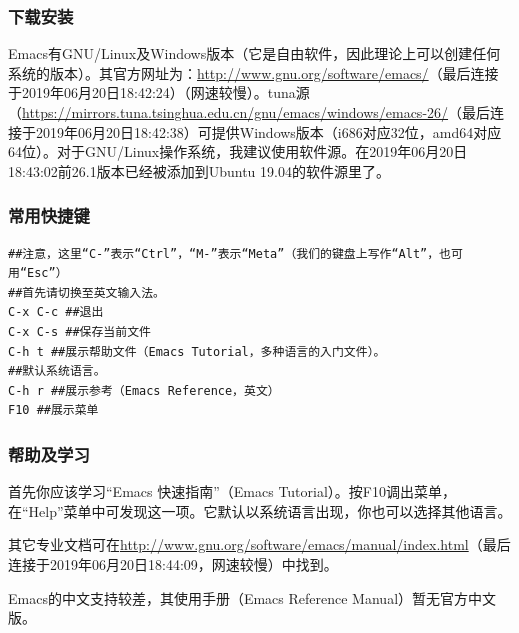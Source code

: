 \subsubsection{下载安装}
Emacs有GNU/Linux及Windows版本（它是自由软件，因此理论上可以创建任何系统的版本）。其官方网址为：\url{http://www.gnu.org/software/emacs/}（最后连接于2019年06月20日18:42:24）（网速较慢）。tuna源（\url{https://mirrors.tuna.tsinghua.edu.cn/gnu/emacs/windows/emacs-26/}（最后连接于2019年06月20日18:42:38）可提供Windows版本（i686对应32位，amd64对应64位）。对于GNU/Linux操作系统，我建议使用软件源。在2019年06月20日18:43:02前26.1版本已经被添加到Ubuntu 19.04的软件源里了。
\subsubsection{常用快捷键}
\begin{verbatim}
##注意，这里“C-”表示“Ctrl”，“M-”表示“Meta”（我们的键盘上写作“Alt”，也可用“Esc”）
##首先请切换至英文输入法。
C-x C-c ##退出
C-x C-s ##保存当前文件
C-h t ##展示帮助文件（Emacs Tutorial，多种语言的入门文件）。
##默认系统语言。
C-h r ##展示参考（Emacs Reference，英文）
F10 ##展示菜单
\end{verbatim}
\subsubsection{帮助及学习}
首先你应该学习“Emacs 快速指南”（Emacs Tutorial）。按F10调出菜单，在“Help”菜单中可发现这一项。它默认以系统语言出现，你也可以选择其他语言。\par
其它专业文档可在\url{http://www.gnu.org/software/emacs/manual/index.html}（最后连接于2019年06月20日18:44:09，网速较慢）中找到。\par
Emacs的中文支持较差，其使用手册（Emacs Reference Manual）暂无官方中文版。
